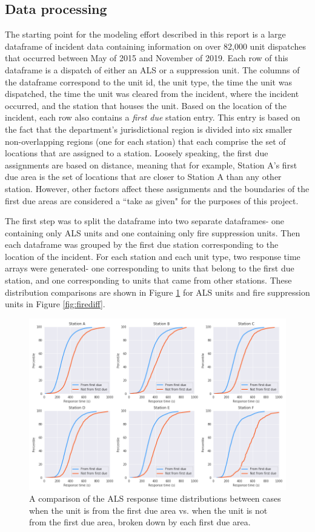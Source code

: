 \documentclass[article]{proc}
\begin{document}
\subsection{Data processing}
The starting point for the modeling effort described in this report is a large dataframe of incident data containing information on over 82,000 unit dispatches that occurred between May of 2015 and November of 2019. Each row of this dataframe is a dispatch of either an ALS or a suppression unit. The columns of the dataframe correspond to the unit id, the unit type, the time the unit was dispatched, the time the unit was cleared from the incident, where the incident occurred, and the station that houses the unit. Based on the location of the incident, each row also contains a \textit{first due} station entry. This entry is based on the fact that the department's jurisdictional region is divided into six smaller non-overlapping regions (one for each station) that each comprise the set of locations that are assigned to a station. Loosely speaking, the first due assignments are based on distance, meaning that for example, Station A's first due area is the set of locations that are closer to Station A than any other station. However, other factors affect these assignments and the boundaries of the first due areas are considered a ``take as given" for the purposes of this project.


The first step was to split the dataframe into two separate dataframes- one containing only ALS units and one containing only fire suppression units. Then each dataframe was grouped by the first due station corresponding to the location of the incident. For each station and each unit type, two response time arrays were generated- one corresponding to units that belong to the first due station, and one corresponding to units that came from other stations. These distribution comparisons are shown in Figure \ref{fig:alsdiff} for ALS units and fire suppression units in Figure \ref{fig:firediff}.


\begin{figure}[!htb]
  \centering
  \includegraphics[width=16cm,keepaspectratio]{Figures/alsdiff.png}
  \caption{A comparison of the ALS response time distributions between cases when the unit is from the first due area vs. when the unit is not from the first due area, broken down by each first due area.}
  \label{fig:alsdiff}
\end{figure}
\end{document}
